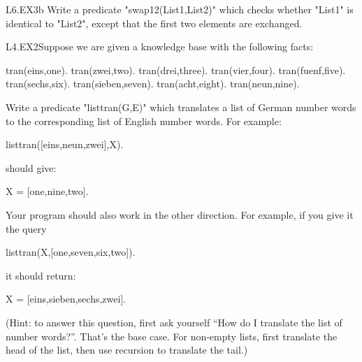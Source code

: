 \begin{LPNexercise}{L6.EX3b}
Write a predicate "swap12(List1,List2)" which checks
whether "List1" is identical to "List2", except that the
first two elements are exchanged.
\end{LPNexercise}


\begin{LPNexercise}{L4.EX2}Suppose we are given a knowledge base with the following facts:

\begin{LPNcodedisplay}
tran(eins,one).
tran(zwei,two).
tran(drei,three).
tran(vier,four).
tran(fuenf,five).
tran(sechs,six).
tran(sieben,seven).
tran(acht,eight).
tran(neun,nine).
\end{LPNcodedisplay}



Write a predicate "listtran(G,E)" which translates a list of
German number words to the corresponding list of English number words.
For example:
\begin{LPNcodedisplay}
listtran([eins,neun,zwei],X).
\end{LPNcodedisplay}
should give:
\begin{LPNcodedisplay}
X = [one,nine,two].
\end{LPNcodedisplay}

Your program should also work in the other direction. For example, if
you give it the query
\begin{LPNcodedisplay}
listtran(X,[one,seven,six,two]).
\end{LPNcodedisplay}
it should return:
\begin{LPNcodedisplay}
X = [eins,sieben,sechs,zwei].
\end{LPNcodedisplay}


(Hint: to answer this question, first ask yourself ``How do I
translate the  list of number words?''.  That's the base
case.  For non-empty lists, first translate the head of the list, then
use recursion to translate the tail.)
\end{LPNexercise}


